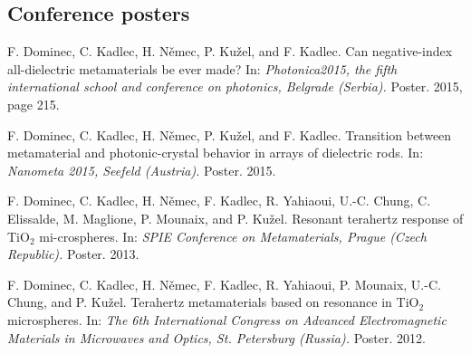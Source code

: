 \documentclass[a4paper,12pt]{report}
\begin{document}
\subsection*{Conference posters}
F. Dominec, C. Kadlec, H. N\v{e}mec, P. Ku\v{z}el, and F. Kadlec. Can negative-index all-dielectric metamaterials be ever made? In: \textit{Photonica2015, the fifth international school and conference on photonics, Belgrade (Serbia).} Poster. 2015, page 215.

\vspace{3mm}\noindent 
F. Dominec, C. Kadlec, H. N\v{e}mec, P. Ku\v{z}el, and F. Kadlec. Transition between metamaterial and photonic-crystal behavior in arrays of dielectric rods. In: \textit{Nanometa 2015, Seefeld (Austria).} Poster. 2015.

\vspace{3mm}\noindent 
F. Dominec, C. Kadlec, H. N\v{e}mec, F. Kadlec, R. Yahiaoui, U.-C. Chung, C. Elissalde, M. Maglione, P. Mounaix, and P. Ku\v{z}el. Resonant terahertz response of TiO$_2$ mi-crospheres. In: \textit{SPIE Conference on Metamaterials, Prague (Czech Republic).} Poster.
2013.

\vspace{3mm}\noindent 
F. Dominec, C. Kadlec, H. N\v{e}mec, F. Kadlec, R. Yahiaoui, P. Mounaix, U.-C. Chung, and P. Ku\v{z}el. Terahertz metamaterials based on resonance in TiO$_2$ microspheres.  In: \textit{The 6th International Congress on Advanced Electromagnetic Materials in Microwaves and Optics, St. Petersburg (Russia).} Poster. 2012.




\thispagestyle{empty} 
\end{document}
